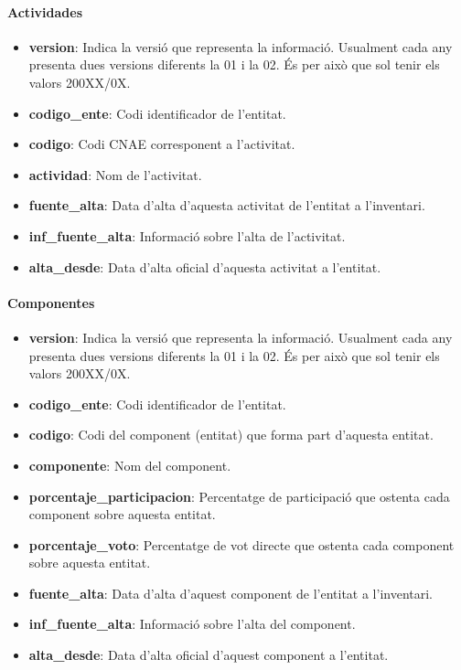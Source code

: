 \documentclass[12pt]{article}
\begin{document}
\paragraph{Actividades\\}
\begin{itemize}
    \item \textbf{version}: Indica la versió que representa la informació. Usualment cada any presenta dues versions diferents la 01 i la 02. És per això que sol tenir els valors 200XX/0X.
    \item \textbf{codigo\_ente}: Codi identificador de l'entitat.
    \item \textbf{codigo}: Codi CNAE corresponent a l'activitat.
    \item \textbf{actividad}: Nom de l'activitat.
    \item \textbf{fuente\_alta}: Data d'alta d'aquesta activitat de l'entitat a l'inventari.
    \item \textbf{inf\_fuente\_alta}: Informació sobre l'alta de l'activitat.
    \item \textbf{alta\_desde}: Data d'alta oficial d'aquesta activitat a l'entitat.
\end{itemize}

\paragraph{Componentes\\}
\begin{itemize}
    \item \textbf{version}: Indica la versió que representa la informació. Usualment cada any presenta dues versions diferents la 01 i la 02. És per això que sol tenir els valors 200XX/0X.
    \item \textbf{codigo\_ente}: Codi identificador de l'entitat.
    \item \textbf{codigo}: Codi del component (entitat) que forma part d'aquesta entitat.
    \item \textbf{componente}: Nom del component.
    \item \textbf{porcentaje\_participacion}: Percentatge de participació que ostenta cada component sobre aquesta entitat.
    \item \textbf{porcentaje\_voto}: Percentatge de vot directe que ostenta cada component sobre aquesta entitat.
    \item \textbf{fuente\_alta}: Data d'alta d'aquest component de l'entitat a l'inventari.
    \item \textbf{inf\_fuente\_alta}: Informació sobre l'alta del component.
    \item \textbf{alta\_desde}: Data d'alta oficial d'aquest component a l'entitat.
\end{itemize}
\end{document}
